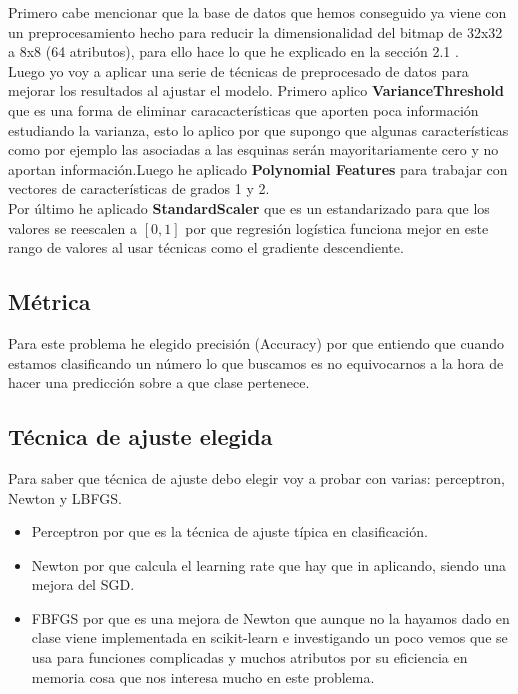 \documentclass[a4paper,11pt]{article}
\begin{document}
Primero cabe mencionar que la base de datos que hemos conseguido ya viene con un preprocesamiento hecho para reducir la dimensionalidad del bitmap de 32x32 a 8x8 (64 atributos), para ello hace lo que he explicado en la sección 2.1 .\\

Luego yo voy a aplicar una serie de técnicas de preprocesado de datos para mejorar los resultados al ajustar el modelo. Primero aplico \textbf{VarianceThreshold} que es una forma de eliminar caracacterísticas que aporten poca información estudiando la varianza, esto lo aplico por que supongo que algunas características como por ejemplo las asociadas a las esquinas serán mayoritariamente cero y no aportan información.Luego he aplicado \textbf{Polynomial Features} para trabajar con vectores de características de grados 1 y 2.\\ 

Por último he aplicado \textbf{StandardScaler} que es un estandarizado para que los valores se reescalen a $[0,1]$ por que regresión logística funciona mejor en este rango de valores al usar técnicas como el gradiente descendiente.

\subsection{Métrica}

Para este problema he elegido precisión (Accuracy) por que entiendo que cuando estamos clasificando un número lo que buscamos es no equivocarnos a la hora de hacer una predicción sobre a que clase pertenece.

\subsection{Técnica de ajuste elegida}

Para saber que técnica de ajuste debo elegir voy a probar con varias: perceptron, Newton y LBFGS.

\begin{itemize}
\item Perceptron por que es la técnica de ajuste típica en clasificación.
\item Newton por que calcula el learning rate que hay que in aplicando, siendo una mejora del SGD.
\item FBFGS por que es una mejora de Newton que aunque no la hayamos dado en clase viene implementada en scikit-learn e investigando un poco vemos que se usa para funciones complicadas y muchos atributos por su eficiencia en memoria cosa que nos interesa mucho en este problema.
\end{itemize}
\end{document}
